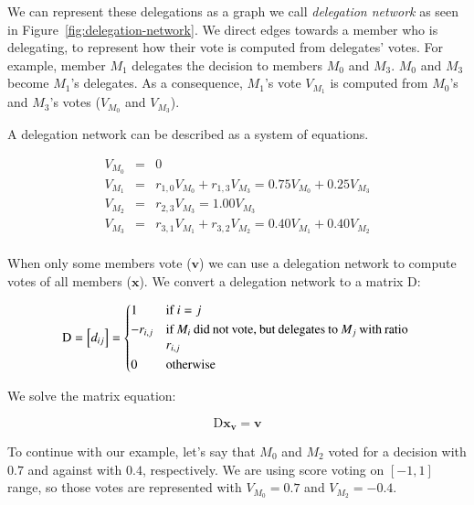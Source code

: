 \documentclass{sigchi}
\begin{document}
We can represent these delegations as a graph we call \emph{delegation network} as seen in
Figure~\ref{fig:delegation-network}.
We direct edges towards a member who is delegating, to represent how their vote is computed from delegates' votes.
For example, member $M_1$ delegates the decision to members $M_0$ and $M_3$.
$M_0$ and $M_3$ become $M_1$'s delegates.
As a consequence, $M_1$'s vote $V_{M_1}$ is computed from $M_0$'s and $M_3$'s votes ($V_{M_0}$ and $V_{M_3}$).

A delegation network can be described as a system of equations.

\begin{displaymath}
\begin{array}{rcl}
V_{M_0} & = & 0 \\
V_{M_1} & = & r_{1,0} V_{M_0} + r_{1,3} V_{M_3} = 0.75 V_{M_0} + 0.25 V_{M_3} \\
V_{M_2} & = & r_{2,3} V_{M_3} = 1.00 V_{M_3} \\
V_{M_3} & = & r_{3,1} V_{M_1} + r_{3,2} V_{M_2} = 0.40 V_{M_1} + 0.40 V_{M_2} \\
\end{array}
\end{displaymath}

When only some members vote ($\mathbf{v}$) we can use a delegation network to compute votes
of all members ($\mathbf{x}$).
We convert a delegation network to a matrix $\mathrm{D}$:

\begin{displaymath}
\mathrm{D} = \left[d_{ij}\right] = \begin{dcases*}
 1 & if $i = j$ \\
 -r_{i,j} & \parbox[t]{.55\columnwidth}{if $M_i$ did not vote, but delegates to $M_j$ with ratio $r_{i,j}$} \\
 0 & otherwise \\
\end{dcases*}
\end{displaymath}

We solve the matrix equation:

\begin{displaymath}
\mathrm{D} \mathbf{x_v} = \mathbf{v}
\end{displaymath}

To continue with our example, let's say that $M_0$ and $M_2$ voted for a decision with $0.7$ and against with $0.4$,
respectively.
We are using score voting on $[-1, 1]$ range, so those votes are represented with $V_{M_0} = 0.7$ and
$V_{M_2} = -0.4$.
\end{document}
